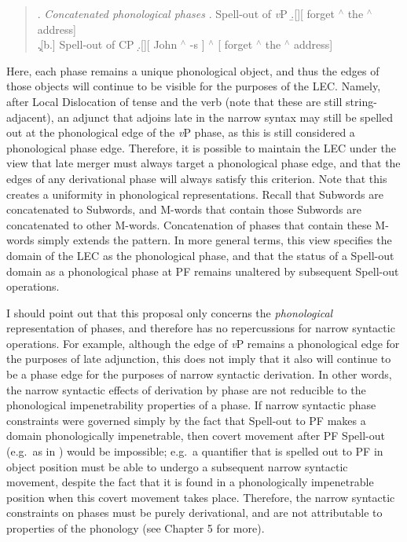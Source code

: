 \singlespacing
\begin{quote}
\ex. {\it Concatenated phonological phases}
\a. Spell-out of {\it v}P
\b.[][ forget $^{\wedge}$ the $^{\wedge}$ address]\\
\c.[b.] Spell-out of CP
\d.[][ John $^{\wedge}$ -s ] $^{\wedge}$ [ forget $^{\wedge}$ the $^{\wedge}$ address]\\

\end{quote}
\onehalfspacing
Here, each phase remains a unique phonological object, and thus the edges of those objects will continue to be visible for the purposes of the LEC. Namely, after Local Dislocation of tense and the verb (note that these are still string-adjacent), an adjunct that adjoins late in the narrow syntax may still be spelled out at the phonological edge of the {\it v}P phase, as this is still considered a phonological phase edge. Therefore, it is possible to maintain the LEC under the view that late merger must always target a phonological phase edge, and that the edges of any derivational phase will always satisfy this criterion. Note that this creates a uniformity in phonological representations. Recall that Subwords are concatenated to Subwords, and M-words that contain those Subwords are concatenated to other M-words. Concatenation of phases that contain these M-words simply extends the pattern. In more general terms, this view specifies the domain of the LEC as the phonological phase, and that the status of a Spell-out domain as a phonological phase at PF remains unaltered by subsequent Spell-out operations.

I should point out that this proposal only concerns the {\it phonological} representation of phases, and therefore has no repercussions for narrow syntactic operations. For example, although the edge of {\it v}P remains a phonological edge for the purposes of late adjunction, this does not imply that it also will continue to be a phase edge for the purposes of narrow syntactic derivation. In other words, the narrow syntactic effects of derivation by phase are not reducible to the phonological impenetrability properties of a phase. If narrow syntactic phase constraints were governed simply by the fact that Spell-out to PF makes a domain phonologically impenetrable, then covert movement after PF Spell-out (e.g.\ as in ) would be impossible; e.g.\ a quantifier that is spelled out to PF in object position must be able to undergo a subsequent narrow syntactic movement, despite the fact that it is found in a phonologically impenetrable position when this covert movement takes place. Therefore, the narrow syntactic constraints on phases must be purely derivational, and are not attributable to properties of the phonology (see Chapter 5 for more).

